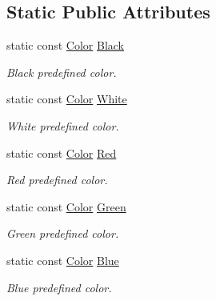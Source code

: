\subsection*{Static Public Attributes}
\begin{DoxyCompactItemize}
\item 
\mbox{\label{classsf_1_1_color_a77c688197b981338f0b19dc58bd2facd}} 
static const \hyperlink{classsf_1_1_color}{Color} \hyperlink{classsf_1_1_color_a77c688197b981338f0b19dc58bd2facd}{Black}
\begin{DoxyCompactList}\small\item\em Black predefined color. \end{DoxyCompactList}\item 
\mbox{\label{classsf_1_1_color_a4fd874712178d9e206f53226002aa4ca}} 
static const \hyperlink{classsf_1_1_color}{Color} \hyperlink{classsf_1_1_color_a4fd874712178d9e206f53226002aa4ca}{White}
\begin{DoxyCompactList}\small\item\em White predefined color. \end{DoxyCompactList}\item 
\mbox{\label{classsf_1_1_color_a127dbf55db9c07d0fa8f4bfcbb97594a}} 
static const \hyperlink{classsf_1_1_color}{Color} \hyperlink{classsf_1_1_color_a127dbf55db9c07d0fa8f4bfcbb97594a}{Red}
\begin{DoxyCompactList}\small\item\em Red predefined color. \end{DoxyCompactList}\item 
\mbox{\label{classsf_1_1_color_a95629b30de8c6856aa7d3afed12eb865}} 
static const \hyperlink{classsf_1_1_color}{Color} \hyperlink{classsf_1_1_color_a95629b30de8c6856aa7d3afed12eb865}{Green}
\begin{DoxyCompactList}\small\item\em Green predefined color. \end{DoxyCompactList}\item 
\mbox{\label{classsf_1_1_color_ab03770d4817426b2614cfc33cf0e245c}} 
static const \hyperlink{classsf_1_1_color}{Color} \hyperlink{classsf_1_1_color_ab03770d4817426b2614cfc33cf0e245c}{Blue}
\begin{DoxyCompactList}\small\item\em Blue predefined color. \end{DoxyCompactList}\item 

\end{DoxyCompactItemize}
